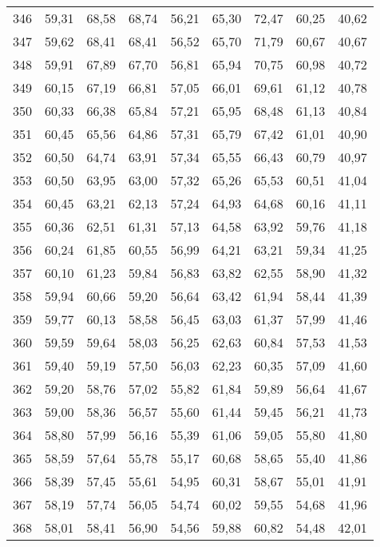 \begin{longtable}{c c c c c c c c c}
      346& 	59,31& 	68,58& 	68,74& 	56,21& 	65,30& 	72,47& 	60,25& 	40,62 \\
      347& 	59,62& 	68,41& 	68,41& 	56,52& 	65,70& 	71,79& 	60,67& 	40,67 \\
      348& 	59,91& 	67,89& 	67,70& 	56,81& 	65,94& 	70,75& 	60,98& 	40,72 \\
      349& 	60,15& 	67,19& 	66,81& 	57,05& 	66,01& 	69,61& 	61,12& 	40,78 \\
      350& 	60,33& 	66,38& 	65,84& 	57,21& 	65,95& 	68,48& 	61,13& 	40,84 \\
      351& 	60,45& 	65,56& 	64,86& 	57,31& 	65,79& 	67,42& 	61,01& 	40,90 \\
      352& 	60,50& 	64,74& 	63,91& 	57,34& 	65,55& 	66,43& 	60,79& 	40,97 \\
      353& 	60,50& 	63,95& 	63,00& 	57,32& 	65,26& 	65,53& 	60,51& 	41,04 \\
      354& 	60,45& 	63,21& 	62,13& 	57,24& 	64,93& 	64,68& 	60,16& 	41,11 \\
      355& 	60,36& 	62,51& 	61,31& 	57,13& 	64,58& 	63,92& 	59,76& 	41,18 \\
      356& 	60,24& 	61,85& 	60,55& 	56,99& 	64,21& 	63,21& 	59,34& 	41,25 \\
      357& 	60,10& 	61,23& 	59,84& 	56,83& 	63,82& 	62,55& 	58,90& 	41,32 \\
      358& 	59,94& 	60,66& 	59,20& 	56,64& 	63,42& 	61,94& 	58,44& 	41,39 \\
      359& 	59,77& 	60,13& 	58,58& 	56,45& 	63,03& 	61,37& 	57,99& 	41,46 \\
      360& 	59,59& 	59,64& 	58,03& 	56,25& 	62,63& 	60,84& 	57,53& 	41,53 \\
      361& 	59,40& 	59,19& 	57,50& 	56,03& 	62,23& 	60,35& 	57,09& 	41,60 \\
      362& 	59,20& 	58,76& 	57,02& 	55,82& 	61,84& 	59,89& 	56,64& 	41,67 \\
      363& 	59,00& 	58,36& 	56,57& 	55,60& 	61,44& 	59,45& 	56,21& 	41,73 \\
      364& 	58,80& 	57,99& 	56,16& 	55,39& 	61,06& 	59,05& 	55,80& 	41,80 \\
      365& 	58,59& 	57,64& 	55,78& 	55,17& 	60,68& 	58,65& 	55,40& 	41,86 \\
      366& 	58,39& 	57,45& 	55,61& 	54,95& 	60,31& 	58,67& 	55,01& 	41,91 \\
      367& 	58,19& 	57,74& 	56,05& 	54,74& 	60,02& 	59,55& 	54,68& 	41,96 \\
      368& 	58,01& 	58,41& 	56,90& 	54,56& 	59,88& 	60,82& 	54,48& 	42,01 \\

\end{longtable}
